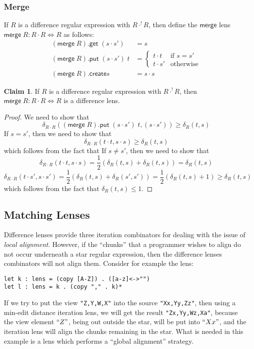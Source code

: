 \documentclass[acmsmall,review,anonymous]{acmart}\settopmatter{printfolios=true,printccs=false,printacmref=false}
\theoremstyle{definition}
\newtheorem{claim}{Claim}
\newcommand{\kw}[1]{\ensuremath{\mathsf{#1}}\xspace}
\newcommand{\get}{\ensuremath{\kw{get}}\xspace}
\newcommand{\pput}{\ensuremath{\kw{put}}\xspace}
\newcommand{\create}{\ensuremath{\kw{create}}\xspace}
\newcommand{\mergelens}{\ensuremath{\kw{merge}}\xspace}
\begin{document}
\subsubsection{Merge}
If $R$ is a difference regular expression with $R \cdot^! R$, then define the \mergelens lens $\mergelens \; R : R \cdot R \Leftrightarrow R$ as follows:
\begin{align*}
(\mergelens \; R).\get \; (s \cdot s') &= s\\
(\mergelens \; R).\pput \; (s \cdot s') \; t &= 
\begin{cases}
t \cdot t & \text{if }s = s'\\
t \cdot s' & \text{otherwise}
\end{cases}\\
(\mergelens \; R).\create s &= s \cdot s
\end{align*}
\begin{claim}
If $R$ is a difference regular expression with $R \cdot^! R$, then $\mergelens \; R : R \cdot R \Leftrightarrow R$ is a difference lens.
\end{claim}
\begin{proof}
We need to show that
$$\delta_{R \cdot R}((\mergelens \; R).\pput \; (s \cdot s') \; t, (s \cdot s')) \geq \delta_R(t, s)$$
If $s = s'$, then we need to show that
$$\delta_{R \cdot R}(t \cdot t, s \cdot s) \geq \delta_R(t, s)$$
which follows from the fact that
If $s \neq s'$, then we need to show that
$$\delta_{R \cdot R}(t \cdot t, s \cdot s) = \frac{1}{2}\left(\delta_R(t, s) + \delta_R(t, s)\right) = \delta_R(t, s)$$
$$\delta_{R \cdot R}(t \cdot s', s \cdot s') = \frac{1}{2}\left(\delta_R(t, s) + \delta_R(s', s')\right) = \frac{1}{2}\left(\delta_R(t, s) + 1\right) \geq \delta_R(t, s)$$
which follows from the fact that $\delta_R(t, s) \leq 1$.
\end{proof}
\subsection{Matching Lenses}
Difference lenses provide three iteration combinators for dealing with the issue of {\em local alignment}. However, if the ``chunks'' that a programmer wishes to align do not occur underneath a star regular expression, then the difference lenses combinators will not align them. Consider for example the lens:
\begin{lstlisting}
let k : lens = (copy [A-Z]) . ([a-z]<->"")
let l : lens = k . (copy "," . k)*
\end{lstlisting}
If we try to put the view \lstinline|"Z,Y,W,X"| into the source \lstinline|"Xx,Yy,Zz"|, then using a min-edit distance iteration lens, we will get the result \lstinline|"Zx,Yy,Wz,Xa"|, because the view element $``Z"$, being out outside the star, will be put into $``Xx"$, and the iteration lens will align the chunks remaining in the star. What is needed in this example is a lens which performs a ``global alignment'' strategy.
\end{document}
